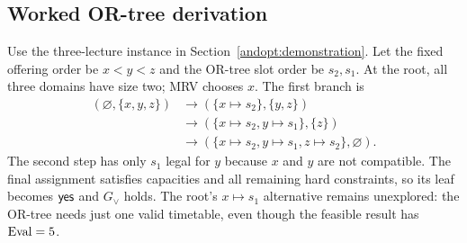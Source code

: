 \subsection{Worked OR-tree derivation}
Use the three-lecture instance in Section~\ref{andopt:demonstration}. Let the fixed offering order be $x<y<z$ and the OR-tree slot order be $s_2,s_1$. At the root, all three domains have size two; MRV chooses $x$. The first branch is
\[
\begin{aligned}
(\varnothing,\{x,y,z\})
&\rightarrow(\{x\mapsto s_2\},\{y,z\})\\
&\rightarrow(\{x\mapsto s_2,y\mapsto s_1\},\{z\})\\
&\rightarrow(\{x\mapsto s_2,y\mapsto s_1,z\mapsto s_2\},\varnothing).
\end{aligned}
\]
The second step has only $s_1$ legal for $y$ because $x$ and $y$ are not compatible. The final assignment satisfies capacities and all remaining hard constraints, so its leaf becomes $\mathsf{yes}$ and $G_{\lor}$ holds. The root's $x\mapsto s_1$ alternative remains unexplored: the OR-tree needs just one valid timetable, even though the feasible result has $\operatorname{Eval}=5$.

